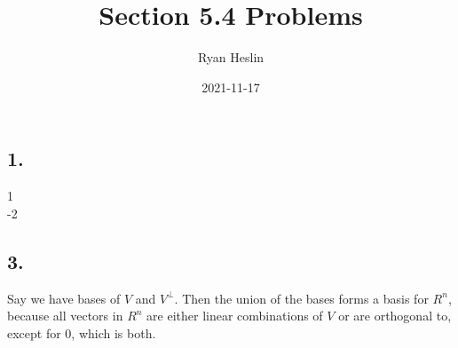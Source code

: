 \documentclass[]{article}
\title{Section 5.4 Problems}
\author{Ryan Heslin}
\date{2021-11-17}
\begin{document}
\maketitle

\newcommand{\abcd}{\begin{bmatrix}a&b\\
c&d\end{bmatrix}}

\newcommand{\m}[1]{\begin{bmatrix}#1\end{bmatrix}}

\newcommand{\vect}[1]{\begin{pmatrix}#1\end{pmatrix}}

\newcommand{\meq}[1]{\begin{split}#1\end{split}}

\newcommand{\bym}[1]{#1\times{m}}

\newcommand{\nby}[1]{n\times{#1}}

\newcommand{\subsp}[2]{\Bigg\{\begin{bmatrix}#1\end{bmatrix}:#2\Bigg\}}

\newcommand{\proj}[2]{\text{proj}_#1(#2)}

\newcommand{\refl}[2]{\text{refl}_#1(#2)}

\newcommand{\sumn}{\sum_{i=1}^n}

\newcommand{\dotsn}[5]{#1_{1}#3_{1}#5{#1}_{2}#3_{2}{#5}\dots{#5}#1_{#2}#3_{#4}}

\hypertarget{section}{%
\subsection{1.}\label{section}}

\begin{\bmatrix}
1\\
-2
\end{\bmatrix}

\hypertarget{section-1}{%
\subsection{3.}\label{section-1}}

Say we have bases of \(V\) and \(V^{\perp}\). Then the union of the
bases forms a basis for \(R^n\), because all vectors in \(R^n\) are
either linear combinations of \(V\) or are orthogonal to, except for 0,
which is both.
\end{document}
